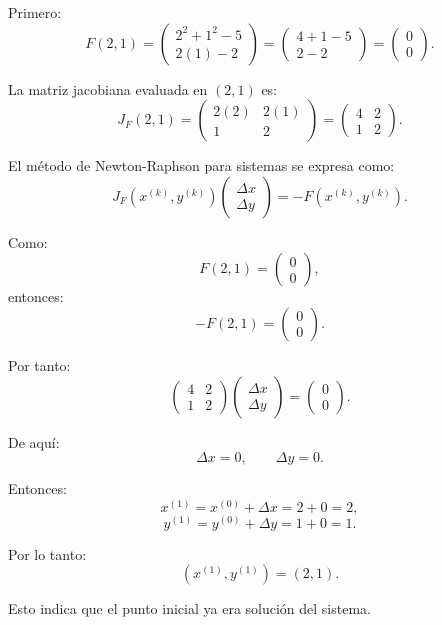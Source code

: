 \documentclass[11pt,respuestas,a4]{aleph-examen}
\begin{document}
\begin{preguntas}
\begin{respuesta}
Primero:
\[
F(2,1)=
\begin{pmatrix}
2^2+1^2-5\\
2(1)-2
\end{pmatrix}
=
\begin{pmatrix}
4+1-5\\
2-2
\end{pmatrix}
=
\begin{pmatrix}
0\\
0
\end{pmatrix}.
\]

La matriz jacobiana evaluada en $(2,1)$ es:
\[
J_F(2,1)=
\begin{pmatrix}
2(2) & 2(1)\\
1 & 2
\end{pmatrix}
=
\begin{pmatrix}
4 & 2\\
1 & 2
\end{pmatrix}.
\]

El método de Newton-Raphson para sistemas se expresa como:
\[
J_F(x^{(k)},y^{(k)})
\begin{pmatrix}
\Delta x\\
\Delta y
\end{pmatrix}
=
-F(x^{(k)},y^{(k)}).
\]

Como:
\[
F(2,1)=
\begin{pmatrix}
0\\
0
\end{pmatrix},
\]
entonces:
\[
-F(2,1)=
\begin{pmatrix}
0\\
0
\end{pmatrix}.
\]

Por tanto:
\[
\begin{pmatrix}
4 & 2\\
1 & 2
\end{pmatrix}
\begin{pmatrix}
\Delta x\\
\Delta y
\end{pmatrix}
=
\begin{pmatrix}
0\\
0
\end{pmatrix}.
\]

De aquí:
\[
\Delta x=0,
\qquad
\Delta y=0.
\]

Entonces:
\[
x^{(1)}=x^{(0)}+\Delta x=2+0=2,
\]
\[
y^{(1)}=y^{(0)}+\Delta y=1+0=1.
\]

Por lo tanto:
\[
\boxed{(x^{(1)},y^{(1)})=(2,1)}.
\]

Esto indica que el punto inicial ya era solución del sistema.
\end{respuesta}



\end{preguntas}
\end{document}
